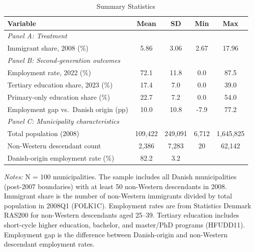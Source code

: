 
\begin{table}[H]
\centering
\caption{Summary Statistics}
\begin{threeparttable}
\begin{tabular}{lcccc}
\toprule
Variable & Mean & SD & Min & Max \\
\midrule
\multicolumn{5}{l}{\textit{Panel A: Treatment}} \\
Immigrant share, 2008 (\%) & 5.86 & 3.06 & 2.67 & 17.96 \\[0.5em]
\multicolumn{5}{l}{\textit{Panel B: Second-generation outcomes}} \\
Employment rate, 2022 (\%) & 72.1 & 11.8 & 0.0 & 87.5 \\
Tertiary education share, 2023 (\%) & 17.4 & 7.0 & 0.0 & 39.0 \\
Primary-only education share (\%) & 22.7 & 7.2 & 0.0 & 54.0 \\
Employment gap vs.\ Danish origin (pp) & 10.0 & 10.8 & -7.9 & 77.2 \\[0.5em]
\multicolumn{5}{l}{\textit{Panel C: Municipality characteristics}} \\
Total population (2008) & 109,422 & 249,091 & 6,712 & 1,645,825 \\
Non-Western descendant count & 2,386 & 7,283 & 20 & 62,142 \\
Danish-origin employment rate (\%) & 82.2 & 3.2 & & \\
\bottomrule
\end{tabular}
\begin{tablenotes}[flushleft]
\small
\item \textit{Notes:} N = 100 municipalities. The sample includes all Danish municipalities (post-2007 boundaries) with at least 50 non-Western descendants in 2008. Immigrant share is the number of non-Western immigrants divided by total population in 2008Q1 (FOLK1C). Employment rates are from Statistics Denmark RAS200 for non-Western descendants aged 25--39. Tertiary education includes short-cycle higher education, bachelor, and master/PhD programs (HFUDD11). Employment gap is the difference between Danish-origin and non-Western descendant employment rates.
\end{tablenotes}
\end{threeparttable}
\label{tab:summary}
\end{table}
